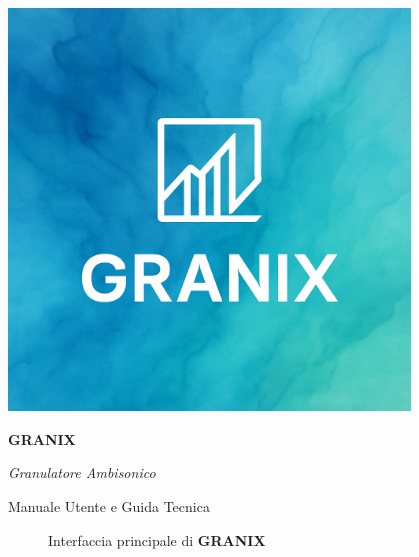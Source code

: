 \documentclass[a4paper,11pt,openany]{book}
\newcommand{\granix}{\textbf{\textcolor{granixblue}{GRANIX}}}
\begin{document}
\begin{titlepage}
    \centering
    \vspace*{2cm}
    
    \includegraphics[width=0.8\textwidth]{img/GRANIX_logo.png} %
    
    \vspace{1.5cm}
    
    {\Huge\bfseries\color{granixblue} GRANIX}
    
    \vspace{0.5cm}
    
    {\Large\textit{Granulatore Ambisonico}}
    
    \vspace{1cm}
    
    {\large Manuale Utente e Guida Tecnica}
    
    \vspace{2cm}
    
    \begin{figure}[H]
        \centering
        \caption*{Interfaccia principale di \granix}
    \end{figure}
    

\end{titlepage}
\end{document}
